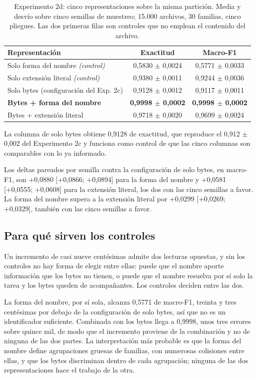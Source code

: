 \begin{table}[ht]
\centering
\caption{Experimento 2d: cinco representaciones sobre la misma partición. Media y desvío sobre cinco semillas de muestreo; 15.000 archivos, 30 familias, cinco pliegues. Las dos primeras filas son controles que no emplean el contenido del archivo.}
\label{tab:exp2d}
\begin{tabular}{|l|c|c|}
\hline
\textbf{Representación} & \textbf{Exactitud} & \textbf{Macro-F1} \\
\hline
Solo forma del nombre \textit{(control)} & 0,5830 $\pm$ 0,0024 & 0,5771 $\pm$ 0,0033 \\
Solo extensión literal \textit{(control)} & 0,9380 $\pm$ 0,0011 & 0,9244 $\pm$ 0,0036 \\
\hline
Solo bytes (configuración del Exp. 2c) & 0,9128 $\pm$ 0,0012 & 0,9117 $\pm$ 0,0011 \\
\textbf{Bytes + forma del nombre} & \textbf{0,9998 $\pm$ 0,0002} & \textbf{0,9998 $\pm$ 0,0002} \\
Bytes + extensión literal & 0,9718 $\pm$ 0,0020 & 0,9699 $\pm$ 0,0024 \\
\hline
\end{tabular}
\end{table}

La columna de solo bytes obtiene 0,9128 de exactitud, que reproduce el 0,912 $\pm$ 0,002 del Experimento 2c y funciona como control de que las cinco columnas son comparables con lo ya informado.

Los deltas pareados por semilla contra la configuración de solo bytes, en macro-F1, son +0,0880 [+0,0866; +0,0894] para la forma del nombre y +0,0581 [+0,0555; +0,0608] para la extensión literal, los dos con las cinco semillas a favor. La forma del nombre supera a la extensión literal por +0,0299 [+0,0269; +0,0329], también con las cinco semillas a favor.

\subsection{Para qué sirven los controles}

Un incremento de casi nueve centésimas admite dos lecturas opuestas, y sin los controles no hay forma de elegir entre ellas: puede que el nombre aporte información que los bytes no tienen, o puede que el nombre resuelva por sí solo la tarea y los bytes queden de acompañantes. Los controles deciden entre las dos.

La forma del nombre, por sí sola, alcanza 0,5771 de macro-F1, treinta y tres centésimas por debajo de la configuración de solo bytes, así que no es un identificador suficiente. Combinada con los bytes llega a 0,9998, unos tres errores sobre quince mil, de modo que el incremento proviene de la combinación y no de ninguna de las dos partes. La interpretación más probable es que la forma del nombre define agrupaciones gruesas de familias, con numerosas colisiones entre ellas, y que los bytes discriminan dentro de cada agrupación; ninguna de las dos representaciones hace el trabajo de la otra.

